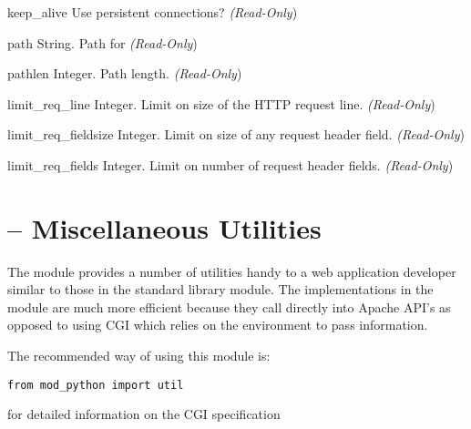 \begin{memberdesc}[server]{keep_alive}
  Use persistent connections?
  \emph{(Read-Only})
\end{memberdesc}

\begin{memberdesc}[server]{path}
  String. Path for 
  \emph{(Read-Only})
\end{memberdesc}

\begin{memberdesc}[server]{pathlen}
  Integer. Path length.
  \emph{(Read-Only})
\end{memberdesc}

\begin{memberdesc}[server]{limit_req_line}
  Integer. Limit on size of the HTTP request line.
  \emph{(Read-Only})
\end{memberdesc}

\begin{memberdesc}[server]{limit_req_fieldsize}
  Integer. Limit on size of any request header field.
  \emph{(Read-Only})
\end{memberdesc}

\begin{memberdesc}[server]{limit_req_fields}
  Integer. Limit on number of request header fields.
  \emph{(Read-Only})
\end{memberdesc}

\section{ -- Miscellaneous Utilities\label{pyapi-util}}

The  module provides a number of utilities handy to a web
application developer similar to those in the standard library
 module. The implementations in the  module
are much more efficient because they call directly into Apache API's
as opposed to using CGI which relies on the environment to pass
information.

The recommended way of using this module is:
\begin{verbatim}
from mod_python import util
\end{verbatim}

\begin{seealso}
           {for detailed information on the CGI specification}
\end{seealso}

